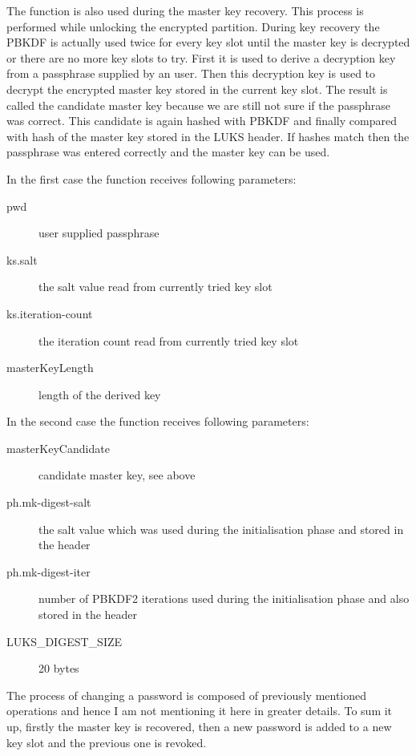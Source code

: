 \documentclass[nolof]{fithesis3}
\begin{document}
The function is also used during the master key recovery. This process is performed while unlocking the encrypted partition. During key recovery the PBKDF is actually used twice for every key slot until the master key is decrypted or there are no more key slots to try. First it is used to derive a decryption key from a passphrase supplied by an user. Then this decryption key is used to decrypt the encrypted master key stored in the current key slot. The result is called the candidate master key because we are still not sure if the passphrase was correct. This candidate is again hashed with PBKDF and finally compared with hash of the master key stored in the LUKS header. If hashes match then the passphrase was entered correctly and the master key can be used.

In the first case the function receives following parameters:

\begin{description}
\item[pwd] user supplied passphrase

\item[ks.salt] the salt value read from currently tried key slot

\item[ks.iteration-count] the iteration count read from currently tried key slot

\item[masterKeyLength] length of the derived key
\end{description}

In the second case the function receives following parameters:

\begin{description}
\item[masterKeyCandidate] candidate master key, see above

\item[ph.mk-digest-salt] the salt value which was used during the initialisation phase and stored in the header

\item[ph.mk-digest-iter] number of PBKDF2 iterations used during the initialisation phase and also stored in the header

\item[LUKS\_DIGEST\_SIZE] 20 bytes
\end{description}

The process of changing a password is composed of previously mentioned operations and hence I am not mentioning it here in greater details. To sum it up, firstly the master key is recovered, then a new password is added to a new key slot and the previous one is revoked.
\end{document}
